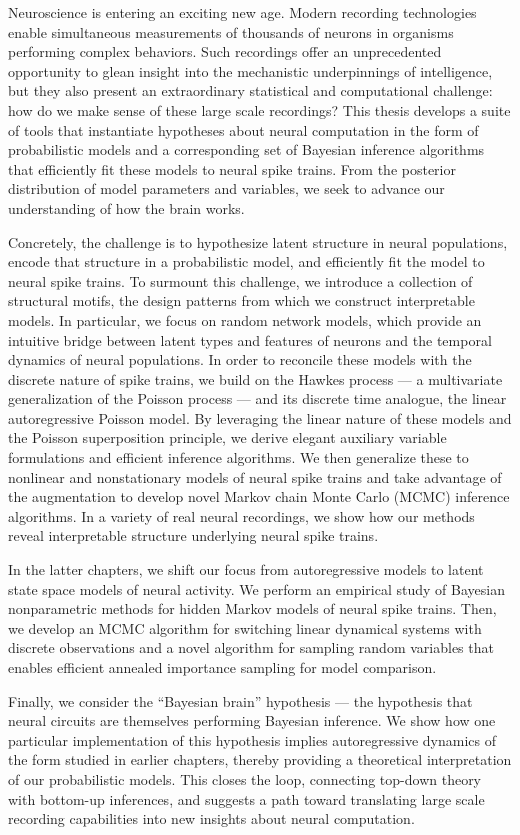 Neuroscience is entering an exciting new age.  Modern recording
technologies enable simultaneous measurements of
thousands of neurons in organisms performing complex behaviors.  Such
recordings offer an unprecedented opportunity to glean insight into
the mechanistic underpinnings of intelligence, but they also present an
extraordinary statistical and computational challenge: how do we make
sense of these large scale recordings?
This thesis develops a suite of tools that instantiate
hypotheses about neural computation in the form of
probabilistic models and a corresponding set of Bayesian inference
algorithms that efficiently fit these models to neural spike trains.
From the posterior distribution of model parameters and variables,
we seek to advance our understanding of how the brain works. 

Concretely, the challenge is to hypothesize latent structure in neural
populations, encode that structure in a probabilistic model, and
efficiently fit the model to neural spike trains. To surmount this
challenge, we introduce a collection of structural motifs, the design
patterns from which we construct interpretable models. In particular,
we focus on random network models, which provide an intuitive bridge
between latent types and features of neurons and the temporal dynamics
of neural populations.  In order to reconcile these models with the discrete
nature of spike trains, we build on the Hawkes process --- a
multivariate generalization of the Poisson process --- and its
discrete time analogue, the linear autoregressive Poisson model.  By
leveraging the linear nature of these models and the Poisson
superposition principle, we derive elegant auxiliary variable
formulations and efficient inference algorithms. We then generalize
these to nonlinear and nonstationary models of neural spike trains and
take advantage of the \polyagamma augmentation to develop novel Markov
chain Monte Carlo (MCMC) inference algorithms.  In a variety of real
neural recordings, we show how our methods reveal interpretable
structure underlying neural spike trains.

In the latter chapters, we shift our focus from autoregressive models
to latent state space models of neural activity. We perform an
empirical study of Bayesian nonparametric methods for hidden Markov
models of neural spike trains. Then, we develop an MCMC algorithm for switching
linear dynamical systems with discrete observations and a novel
algorithm for sampling \polyagamma random variables that enables 
efficient annealed importance sampling for model comparison.

Finally, we consider the ``Bayesian brain'' hypothesis --- the
hypothesis that neural circuits are themselves performing Bayesian
inference.  We show how one particular implementation of this
hypothesis implies autoregressive dynamics of the form studied
in earlier chapters, thereby providing a theoretical interpretation of
our probabilistic models.  This closes the
loop, connecting top-down theory with bottom-up inferences, and
suggests a path toward translating large scale recording
capabilities into new insights about neural computation.


